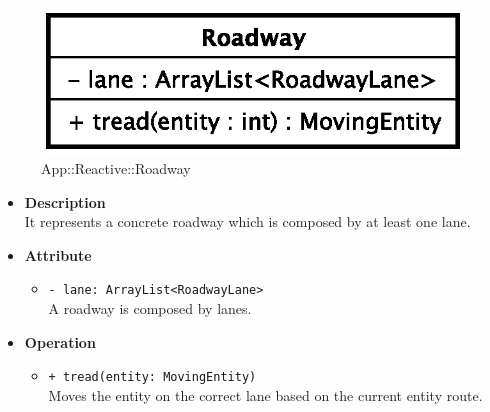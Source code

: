 \begin{figure}[h]
\centering
\includegraphics[scale=0.6,keepaspectratio]{images/solution/roadway.eps}
\caption{App::Reactive::Roadway}
\label{fig:sd-app-roadway}
\end{figure}
\FloatBarrier
\begin{itemize}
  \item \textbf{Description} \\
    It represents a concrete roadway which is composed by at least one lane.
  \item \textbf{Attribute}
  \begin{itemize}
    \item \texttt{- lane: ArrayList<RoadwayLane>} \\
A roadway is composed by lanes.
  \end{itemize}
  \item \textbf{Operation}
  \begin{itemize} 
    \item \texttt{+ tread(entity: MovingEntity)} \\
Moves the entity on the correct lane based on the current entity route. 
  \end{itemize}
\end{itemize}
